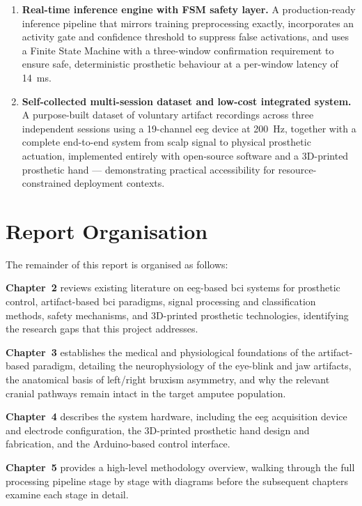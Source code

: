 \begin{enumerate}[leftmargin=*, label=\textbf{C\arabic*.}]
    \item \textbf{Real-time inference engine with FSM safety layer.}
    A production-ready inference pipeline that mirrors training
    preprocessing exactly, incorporates an activity gate and
    confidence threshold to suppress false activations, and uses a
    Finite State Machine with a three-window confirmation requirement
    to ensure safe, deterministic prosthetic behaviour at a per-window
    latency of \SI{14}{\milli\second}.

    \item \textbf{Self-collected multi-session dataset and low-cost
    integrated system.} A purpose-built dataset of voluntary artifact
    recordings across three independent sessions using a 19-channel
    \acrshort{eeg} device at \SI{200}{\hertz}, together with a complete
    end-to-end system from scalp signal to physical prosthetic
    actuation, implemented entirely with open-source software and a
    3D-printed prosthetic hand — demonstrating practical accessibility
    for resource-constrained deployment contexts.

\end{enumerate}

\section{Report Organisation}
\label{sec:organisation}

The remainder of this report is organised as follows:

\textbf{Chapter~2} reviews existing literature on
\acrshort{eeg}-based \acrshort{bci} systems for prosthetic control,
artifact-based \acrshort{bci} paradigms, signal processing and
classification methods, safety mechanisms, and 3D-printed prosthetic
technologies, identifying the research gaps that this project addresses.

\textbf{Chapter~3} establishes the medical and physiological
foundations of the artifact-based paradigm, detailing the
neurophysiology of the eye-blink and jaw artifacts, the anatomical
basis of left/right bruxism asymmetry, and why the relevant cranial
pathways remain intact in the target amputee population.

\textbf{Chapter~4} describes the system hardware, including the
\acrshort{eeg} acquisition device and electrode configuration, the
3D-printed prosthetic hand design and fabrication, and the
Arduino-based control interface.

\textbf{Chapter~5} provides a high-level methodology overview,
walking through the full processing pipeline stage by stage with
diagrams before the subsequent chapters examine each stage in detail.


